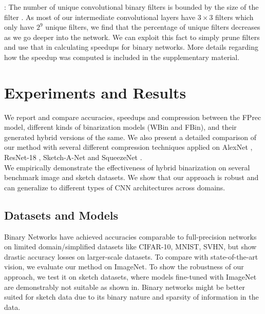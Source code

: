 : The number of unique convolutional binary filters is bounded by the size of the filter \cite{courbariaux2016binarized}. As most of our intermediate convolutional layers have $3\times3$ filters which only have $2^9$ unique filters, we find that the percentage of unique filters decreases as we go deeper into the network. We can exploit this fact to simply prune filters and use that in calculating speedups for binary networks. More details regarding how the speedup was computed is included in the supplementary material.

\section{Experiments and Results}

\noindent We report and compare accuracies, speedups and compression between the FPrec model, different kinds of binarization models (WBin and FBin), and their generated hybrid versions of the same. We also present a detailed comparison of our method with several different compression techniques applied on AlexNet \cite{alex2012alexnet}, ResNet-18 \cite{he2016deep}, Sketch-A-Net \cite{eitz2012hdhso} and SqueezeNet \cite{iandola2016squeezenet}. \\

\noindent We empirically demonstrate the effectiveness of hybrid binarization on several benchmark image and sketch datasets. We show that our approach is robust and can generalize to different types of CNN architectures across domains.

\subsection{Datasets and Models}
\noindent Binary Networks have achieved accuracies comparable to full-precision networks on limited domain/simplified datasets like CIFAR-10, MNIST, SVHN, but show drastic accuracy losses on larger-scale datasets. To compare with state-of-the-art vision, we evaluate our method on ImageNet\cite{deng2009imagenet}. To show the robustness of our approach, we test it on sketch datasets, where models fine-tuned with ImageNet are demonstrably not suitable as shown in\cite{yu2015sketch}. Binary networks might be better suited for sketch data due to its binary nature and sparsity of information in the data. \\

